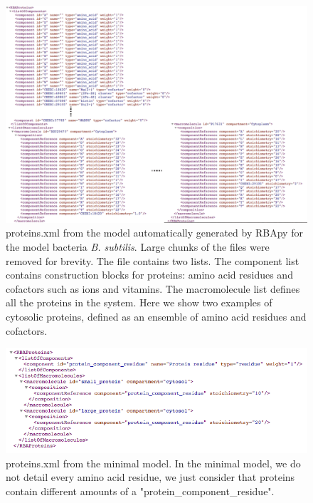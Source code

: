 \begin{figure}
  \centering
  \includegraphics[scale=0.4]{figures/proteins_ex_1}
  \caption{proteins.xml from the model automatically generated by RBApy for the
  model bacteria \textit{B. subtilis}. Large chunks of the files were removed
  for brevity. The file contains two lists.
  The component list contains construction blocks for proteins: amino acid
  residues and cofactors such as ions and vitamins.
  The macromolecule list defines all the proteins in the system.
  Here we show two examples of cytosolic proteins, defined as an ensemble of
  amino acid residues and cofactors.}
  \label{fig:proteins_ex_1}
\end{figure}

\begin{figure}
  \centering
  \includegraphics[scale=0.6]{figures/proteins_ex_2}
  \caption{proteins.xml from the minimal model.
  In the minimal model, we do not detail every amino acid residue, we just
  consider that proteins contain different amounts of a
  "protein\_component\_residue".}
  \label{fig:proteins_ex_2}
\end{figure}
